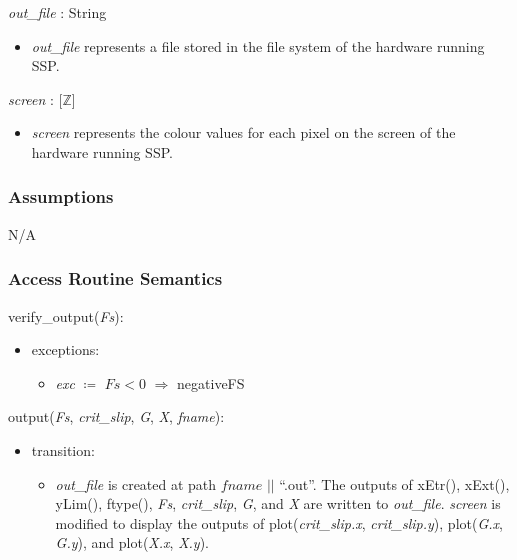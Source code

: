 \documentclass[12pt, titlepage]{article}
\newcommand{\progname}{SSP}
\begin{document}
\textit{out\_file} : String
\begin{itemize}
	\item \textit{out\_file} represents a file stored in the file system of the 
	hardware running \progname{}. \\
\end{itemize}

\noindent \textit{screen} : [$\mathbb{Z}$]
\begin{itemize}
	\item \textit{screen} represents the colour values for each pixel on the 
	screen of the hardware running \progname{}. \\
\end{itemize}

\subsubsection{Assumptions}
N/A

\subsubsection{Access Routine Semantics}
verify\_output(\textit{Fs}):
\begin{itemize}
	\item exceptions:
	\begin{itemize}
		\item[] \textit{exc} $\coloneqq$ $\textit{Fs} < 0$ 
		$\Rightarrow$ negativeFS\\
	\end{itemize}
\end{itemize}

\noindent output(\textit{Fs}, \textit{crit\_slip}, \textit{G}, \textit{X}, 
\textit{fname}):
\begin{itemize}
	\item transition:
	\begin{itemize}
		\item[] \textit{out\_file} is created at path $\textit{fname}$ $||$ 
		``.out''. The outputs of xEtr(), xExt(), yLim(), ftype(), \textit{Fs}, 
		\textit{crit\_slip}, \textit{G}, and \textit{X} are written to 
		\textit{out\_file}.
		\textit{screen} is modified to display the outputs of 
		plot(\textit{crit\_slip.x}, \textit{crit\_slip.y}), plot(\textit{G.x}, 
		\textit{G.y}), and plot(\textit{X.x}, \textit{X.y}).  \\
	\end{itemize}
\end{itemize}
\end{document}
